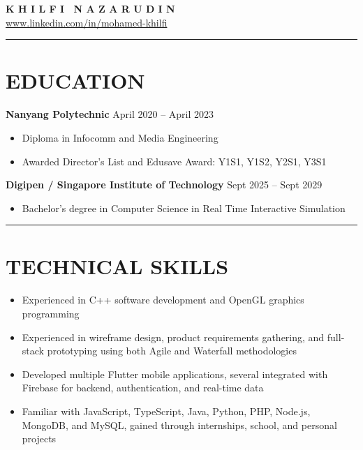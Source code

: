 \documentclass[11pt,a4paper]{article}
\newcommand{\sectionrule}{\noindent\rule{\textwidth}{0.8pt}}
\newcommand{\entrytitle}[2]{%
  \noindent\textbf{#1} \hfill #2\\
}
\begin{document}
\begin{center}
  {\fontsize{28}{30}\selectfont \textbf{K H I L F I \ N A Z A R U D I N}}\\[1pt]
  \small \href{https://www.linkedin.com/in/mohamed-khilfi}{www.linkedin.com/in/mohamed-khilfi}
\end{center}
\sectionrule

\section*{EDUCATION}
\vspace{2pt}
 
\entrytitle{Nanyang Polytechnic}{April 2020 -- April 2023}
\vspace{-8pt}
\begin{itemize}[itemsep=0pt, topsep=2pt, parsep=0pt]
  \item Diploma in Infocomm and Media Engineering
  \item Awarded Director's List and Edusave Award: Y1S1, Y1S2, Y2S1, Y3S1
\end{itemize}
 
\vspace{4pt}
\entrytitle{Digipen / Singapore Institute of Technology}{Sept 2025 -- Sept 2029}
\begin{itemize}[itemsep=0pt, topsep=2pt, parsep=0pt]
  \item Bachelor's degree in Computer Science in Real Time Interactive Simulation
\end{itemize}
\sectionrule

\section*{TECHNICAL SKILLS}
\vspace{2pt}
\begin{itemize}
  \item Experienced in C++ software development and OpenGL graphics programming
  \item Experienced in wireframe design, product requirements gathering, and full-stack prototyping using both Agile and Waterfall methodologies
  \item Developed multiple Flutter mobile applications, several integrated with Firebase for backend, authentication, and real-time data
  \item Familiar with JavaScript, TypeScript, Java, Python, PHP, Node.js, MongoDB, and MySQL, gained through internships, school, and personal projects
\end{itemize}
\end{document}

